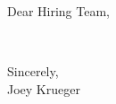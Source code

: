 \documentclass[11pt,letterpaper]{letter}
\begin{document}
\address{Joseph Laurent Krueger \\ Seattle, WA \\ Email: josephkrueger@protonmail.com \\ Phone: (360) 763-3490 \\ \today}
\date{} %
\begin{letter}{}
\opening{Dear {\companyname} Hiring Team,}
\\
\closing{Sincerely, \\ Joey Krueger}
\end{letter}

\end{document}
